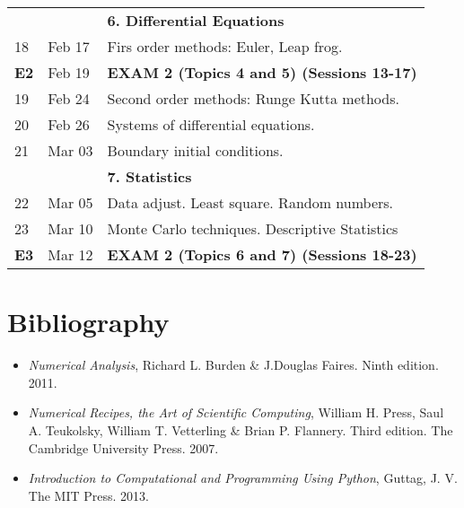 \documentclass[a4,useAMS,usenatbib,usegraphicx,12pt]{article}
\begin{document}
\begin{table}[!ht]
\begin{small}
\begin{flushleft}
\begin{center}
\begin{tabular}{l  l  l}
	& & \textbf{6. Differential Equations} \\
	18 & Feb 17& Firs order methods: Euler, Leap frog. \\
	\textbf{E2} & Feb 19& \textbf{EXAM 2 (Topics 4 and 5) (Sessions 13-17)} \\
	19 & Feb 24& Second order methods: Runge Kutta methods. \\
	20 & Feb 26& Systems of differential equations.\\
	21 & Mar 03& Boundary initial conditions.\\
	& & \textbf{7. Statistics} \\
	22 & Mar 05&  Data adjust. Least square. Random numbers.\\
	23 & Mar 10&  Monte Carlo techniques. Descriptive Statistics\\
	\textbf{E3} & Mar 12& \textbf{EXAM 2 (Topics 6 and 7) (Sessions 18-23)} \\
	\hline\hline
  \end{tabular}  
\end{center}
\end{flushleft}
\end{small}
\end{table}

\newpage
\section*{Bibliography}
\begin{itemize}
\item \textit{Numerical Analysis}, Richard L. Burden \& J.Douglas Faires. Ninth edition. 2011.
\item \textit{Numerical Recipes, the Art of Scientific Computing}, William H. Press, Saul A. Teukolsky,
William T. Vetterling \& Brian P. Flannery. Third edition. The Cambridge University Press. 2007.
\item \textit{Introduction to Computational and Programming Using Python}, Guttag, J. V. 
The MIT Press. 2013.
\end{itemize}

\end{document}
